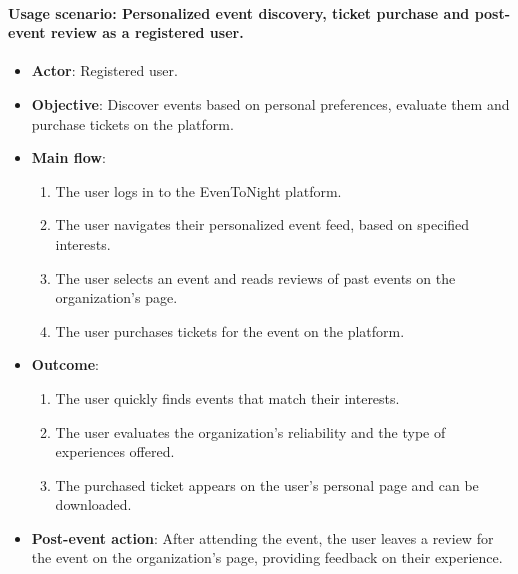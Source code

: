 \paragraph{Usage scenario: Personalized event discovery, ticket purchase and post-event review as a registered user.}
\begin{itemize}
  \item \textbf{Actor}: Registered user.
  \item \textbf{Objective}: Discover events based on personal preferences, evaluate them and purchase tickets on the platform.
  \item \textbf{Main flow}:
    \begin{enumerate}
      \item The user logs in to the EvenToNight platform.
      \item The user navigates their personalized event feed, based on specified interests.
      \item The user selects an event and reads reviews of past events on the organization's page.
      \item The user purchases tickets for the event on the platform.
    \end{enumerate}
  \item \textbf{Outcome}:
    \begin{enumerate}
      \item The user quickly finds events that match their interests.
      \item The user evaluates the organization's reliability and the type of experiences offered.
      \item The purchased ticket appears on the user's personal page and can be downloaded.
    \end{enumerate}
  \item \textbf{Post-event action}: After attending the event, the user leaves a review for the event on the organization's page, providing feedback on their experience.
\end{itemize}

